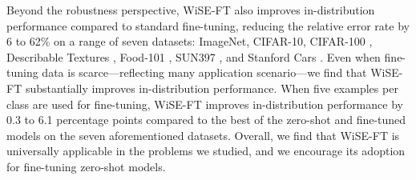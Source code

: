 Beyond the robustness perspective, WiSE-FT also improves in-distribution performance compared to standard fine-tuning, reducing the relative error rate by 6 to 62\% on a range of seven datasets: ImageNet, CIFAR-10, CIFAR-100 \cite{krizhevsky2009learning}, Describable Textures \cite{dtd}, Food-101 \cite{food101}, SUN397 \cite{sun397}, and Stanford Cars \cite{cars}.
Even when fine-tuning data is scarce—reflecting many application scenario---we find that WiSE-FT substantially improves in-distribution performance.
When five examples per class are used for fine-tuning, WiSE-FT improves in-distribution performance by 0.3 to 6.1 percentage points compared to the best of the zero-shot and fine-tuned models on the seven aforementioned datasets.
Overall, we find that WiSE-FT is universally applicable in the problems we studied, and we encourage its adoption for fine-tuning zero-shot models.





